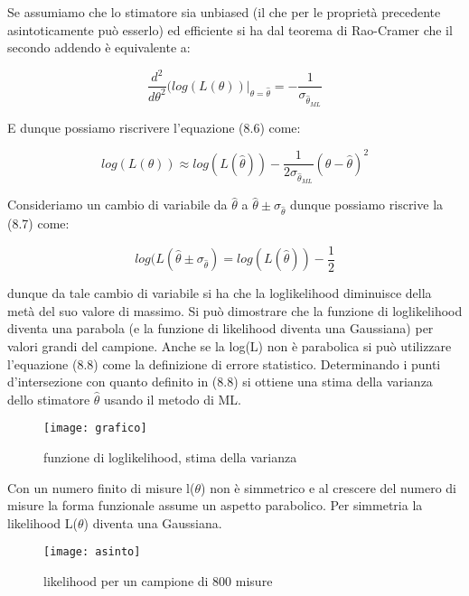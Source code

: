 \noindent Se assumiamo che lo stimatore sia unbiased (il che per le propriet\`{a} precedente asintoticamente pu\`{o} esserlo) ed efficiente si ha dal teorema di Rao-Cramer che il secondo addendo \`{e} equivalente a:

\begin{equation*}
		\frac{d^2}{d\theta^2}(log(L(\theta))\vert_{\theta = \hat{\theta}} = - \frac{1}{\sigma_{\hat{\theta}_{ML}}}
\end{equation*}

\noindent E dunque possiamo riscrivere l'equazione (8.6) come:


\begin{equation}
	log(L(\theta)) \approx log(L(\hat{\theta})) -\frac{1}{2\sigma_{\hat{\theta}_{ML}}} (\theta - \hat{\theta})^2
\end{equation}

\noindent Consideriamo un cambio di variabile da $\hat{\theta}$ a $\hat{\theta}\pm \sigma_{\hat{\theta}}$ dunque possiamo riscrive la (8.7) come:

\begin{equation}
	log(L(\hat{\theta}\pm \sigma_{\hat{\theta}}) = log(L(\hat{\theta})) - \frac{1}{2}
\end{equation}

\noindent dunque da tale cambio di variabile si ha che la loglikelihood diminuisce della met\`{a} del suo valore di massimo. Si pu\`{o} dimostrare che la funzione di loglikelihood diventa una parabola (e la funzione di likelihood diventa una Gaussiana) per valori grandi del campione. Anche se la log(L) non \`{e} parabolica si pu\`{o} utilizzare l'equazione (8.8) come la definizione di errore statistico. Determinando i punti d'intersezione con quanto definito in (8.8) si ottiene una stima della varianza dello stimatore $\hat{\theta}$ usando il metodo di ML.

 
\begin{figure}[!ht]
\vspace{0.2in}
\texttt{[image: grafico]}	
\centering
\vspace{0.2in}
\caption{funzione di loglikelihood, stima della varianza}
\end{figure}

\noindent Con un numero finito di misure l($\theta$) non \`{e} simmetrico e al crescere del numero di misure la forma funzionale assume un aspetto parabolico. Per simmetria la likelihood L($\theta$) diventa una Gaussiana.

 
\begin{figure}[!ht]
\texttt{[image: asinto]}	
\centering
\caption{likelihood per un campione di 800 misure}
\end{figure}

